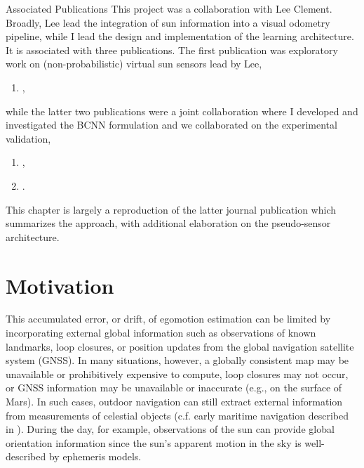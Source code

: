 \begin{remark}{Associated Publications}
This project was a collaboration with Lee Clement. Broadly, Lee lead the integration of sun information into a visual odometry pipeline, while I lead the design and implementation of the learning architecture. It is associated with three publications. The first publication was exploratory work on (non-probabilistic) virtual sun sensors lead by Lee,
\begin{enumerate}
\item {},
\end{enumerate}
while the latter two publications were a joint collaboration where I developed and investigated the BCNN formulation and we collaborated on the experimental validation,
\begin{enumerate}[resume]
\item {},
\item {}.
\end{enumerate}
This chapter is largely a reproduction of the latter journal publication which summarizes the approach, with additional elaboration on the pseudo-sensor architecture.
\end{remark} 

\section{Motivation}


This accumulated error, or drift, of egomotion estimation can be limited by incorporating external global information such as observations of known landmarks, loop closures, or position updates from the global navigation satellite system (GNSS).
In many situations, however, a globally consistent map may be unavailable or prohibitively expensive to compute, loop closures may not occur, or GNSS information may be unavailable or inaccurate (e.g., on the surface of Mars).
In such cases, outdoor navigation can still extract external information from measurements of celestial objects (c.f. early maritime navigation described in ). During the day, for example, observations of the sun can provide global orientation information since the sun's apparent motion in the sky is well-described by ephemeris models.


